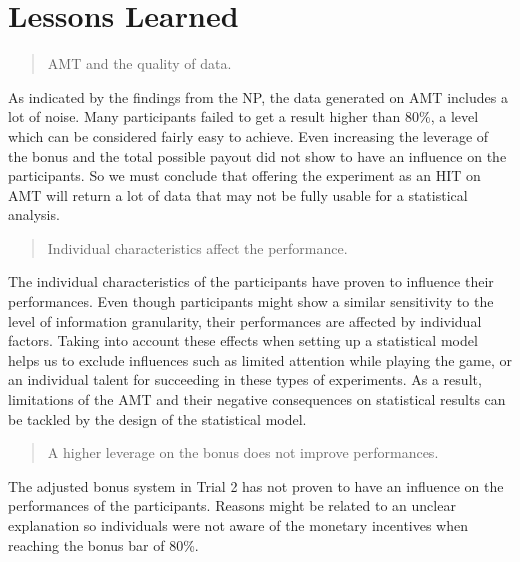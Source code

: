 \section{Lessons Learned}
\begin{quote}
\acf{AMT} and the quality of data.
\end{quote}
As indicated by the findings from the \acl{NP}, the data generated on \ac{AMT} includes a lot of noise. Many participants failed to get a result higher than 80\%, a level which can be considered fairly easy to achieve. Even increasing the leverage of the bonus and the total possible payout did not show to have an influence on the participants. So we must conclude that offering the experiment as an \ac{HIT} on \ac{AMT} will return a lot of data that may not be fully usable for a statistical analysis. 
\begin{quote}
Individual characteristics affect the performance.
\end{quote}
The individual characteristics of the  participants have proven to influence their performances. Even though participants might show a similar sensitivity to the level of information granularity, their performances are affected by individual factors. Taking into account these effects when setting up a statistical model helps us to exclude influences such as limited attention while playing the game, or an individual talent for succeeding in these types of experiments. As a result, limitations of the \acl{AMT} and their negative consequences on statistical results can be tackled by the design of the statistical model.
\begin{quote}
A higher leverage on the bonus does not improve performances.
\end{quote}
The adjusted bonus system in Trial 2 has not proven to have an influence on the performances of the participants. Reasons might be related to an unclear explanation so individuals were not aware of the monetary incentives when reaching the bonus bar of 80\%.
%
